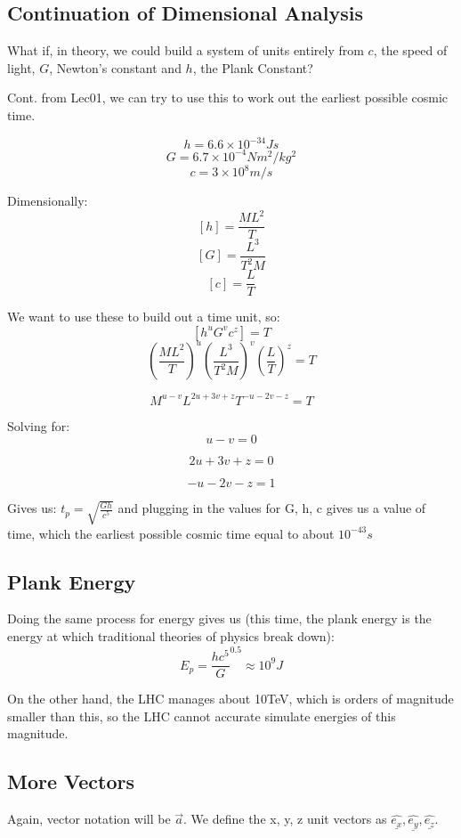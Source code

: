 \subsection*{Continuation of Dimensional Analysis}
What if, in theory, we could build a system of units entirely from $c$, the speed of light, $G$, Newton's constant and $h$, the Plank Constant?

Cont. from Lec01, we can try to use this to work out the earliest possible cosmic time.

\[
    h = 6.6 \times 10^{-34}Js
\]
\[
    G = 6.7 \times 10^{-4} N m^2 / kg^2
\]
\[
    c = 3 \times 10^8 m/s
\]

Dimensionally:
\[
    [h] = \frac{ML^2}{T}
\]
\[
    [G] = \frac{L^3}{T^2 M}
\]
\[
    [c] = \frac{L}{T}
\]

We want to use these to build out a time unit, so:
\[
    [h^u G^v c^z] = T
\]
\[
    \left(\frac{ML^2}{T}\right)^u \left(\frac{L^3}{T^2 M}\right)^v \left(\frac{L}{T}\right)^z = T
\]

\[
    M^{u-v} L^{2u + 3v + z} T^{-u - 2v -z} = T
\]

Solving for:
\[
    u-v = 0
\]

\[
    2u+3v + z = 0
\]

\[
    -u - 2v - z = 1
\]

Gives us:
$t_p = \sqrt{\frac{Gh}{c^5}}$ and plugging in the values for G, h, c gives us a value of time, which the earliest possible cosmic time equal to about $10^{-43}s$


\subsection*{Plank Energy}
Doing the same process for energy gives us (this time, the plank energy is the energy at which traditional theories of physics break down):
\[
    E_p = \frac{hc^5}{G}^{0.5} \approx 10^9 J
\]

On the other hand, the LHC manages about 10TeV, which is orders of magnitude smaller than this, so the LHC cannot accurate simulate energies of this magnitude.

\subsection*{More Vectors}
Again, vector notation will be $\vec{a}$. We define the x, y, z unit vectors as $\underline{\hat{e_x}}, \underline{\hat{e_y}}, \underline{\hat{e_z}}$.

